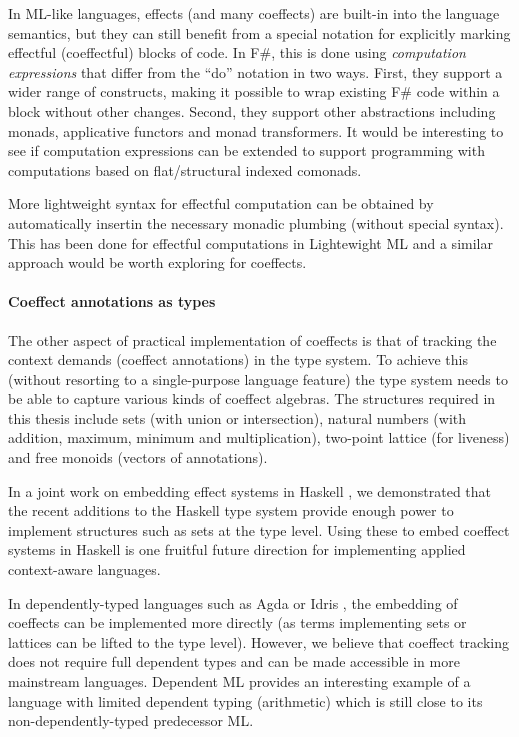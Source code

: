 In ML-like languages, effects (and many coeffects) are built-in into the language semantics,
but they can still benefit from a special notation for explicitly marking effectful (coeffectful)
blocks of code. In F\#, this is done using \emph{computation expressions}  \cite{app-computation-zoo}
that differ from the ``do'' notation in two ways. First, they support a wider range of
constructs, making it possible to wrap existing F\# code within a block without other changes.
Second, they support other abstractions including monads, applicative functors and monad
transformers. It would be interesting to see if computation expressions can be extended to
support programming with computations based on flat/structural indexed comonads.

More lightweight syntax for effectful computation can be obtained by
automatically insertin the necessary monadic plumbing (without
special syntax). This has been done for effectful computations in Lightewight ML
\cite{monads-lightweight-ml} and a similar approach would be worth exploring for coeffects.


\paragraph{Coeffect annotations as types}

The other aspect of practical implementation of coeffects is that of tracking the context demands
(coeffect annotations) in the type system. To achieve this (without resorting to a single-purpose
language feature) the type system needs to be able to capture various kinds of coeffect algebras.
The structures required in this thesis include sets (with union or intersection), natural numbers (with
addition, maximum, minimum and multiplication), two-point lattice (for liveness) and free monoids
(vectors of annotations).

In a joint work on embedding effect systems in Haskell \cite{effects-embedding}, we demonstrated that
the recent additions to the Haskell type system provide enough power to implement structures such
as sets at the type level. Using these to embed coeffect systems in Haskell is one fruitful
future direction for implementing applied context-aware languages.

In dependently-typed languages such as Agda or Idris \cite{other-agda,other-idris},
the embedding of coeffects can be implemented more directly (as terms implementing sets or lattices
can be lifted to the type level). However, we believe that coeffect tracking does not require full
dependent types and can be made accessible in more mainstream languages. Dependent ML
\cite{types-dependent-ml} provides an interesting example of a language with limited dependent typing
(arithmetic) which is still close to its non-dependently-typed predecessor ML.

